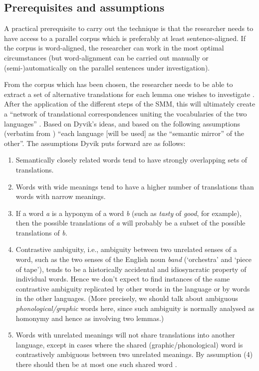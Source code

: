\subsection{Prerequisites and assumptions}
\label{sec:3.4.2}
A practical prerequisite to carry out the technique is that the researcher needs to have access to a parallel corpus which is preferably at least sentence-aligned. If the corpus is word-aligned, the researcher can work in the most optimal circumstances (but word-alignment can be carried out manually or (semi-)automatically on the parallel sentences under investigation).

From the corpus which has been chosen, the researcher needs to be able to extract a set of alternative translations for each lemma one wishes to investigate \citep[31]{langemets_translations_2005}. After the application of the different steps of the SMM, this will ultimately create a “network of translational correspondences uniting the vocabularies of the two languages” \citep[31]{langemets_translations_2005}. Based on Dyvik’s ideas, and based on the following assumptions (verbatim from \citealt[31--32]{langemets_translations_2005}) “each language [will be used] as the ``semantic mirror'' of the other”. The assumptions Dyvik \citep[31--32]{langemets_translations_2005} puts forward are as follows:

\begin{enumerate}
\item
Semantically closely related words tend to have strongly overlapping sets of translations.
\item
Words with wide meanings tend to have a higher number of translations than words with narrow meanings.
\item
If a word \textit{a} is a hyponym of a word \textit{b} (such as \textit{tasty} of \textit{good}, for example), then the possible translations of \textit{a} will probably be a subset of the possible translations of \textit{b.}
\item
Contrastive ambiguity, i.e., ambiguity between two unrelated senses of a word, such as the two senses of the English noun \textit{band} (‘orchestra’ and ‘piece of tape’), tends to be a historically accidental and idiosyncratic property of individual words. Hence we don’t expect to find instances of the same contrastive ambiguity replicated by other words in the language or by words in the other languages. (More precisely, we should talk about ambiguous \textit{phonological/graphic} words here, since such ambiguity is normally analysed as homonymy and hence as involving two lemmas.)
\item
Words with unrelated meanings will not share translations into another language, except in cases where the shared (graphic\slash phonological) word is contrastively ambiguous between two unrelated meanings. By assumption (4) there should then be at most one such shared word \citep[31--32]{langemets_translations_2005}.
\end{enumerate}


